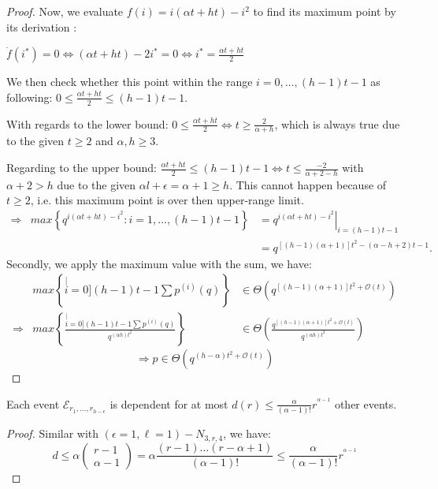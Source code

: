 \begin{proof}
Now, we evaluate $f(i)=i(\alpha t+ht)-i^{2}$ to find its maximum
point by its derivation : 

$\dot{f}(i^{*})=0\Leftrightarrow(\alpha t+ht)-2i^{*}=0\Leftrightarrow i^{*}=\frac{\alpha t+ht}{2}$

We then check whether this point within the range $i=0,\ldots,(h-1)t-1$
as following: $0\leq\frac{\alpha t+ht}{2}\leq(h-1)t-1$.

With regards to the lower bound: $0\leq\frac{\alpha t+ht}{2}\Leftrightarrow t\geq\frac{2}{\alpha+h}$,
which is always true due to the given $t\geq2$ and $\alpha,h\geq3$.

Regarding to the upper bound: $\frac{\alpha t+ht}{2}\leq(h-1)t-1\Leftrightarrow t\leq\frac{-2}{\alpha+2-h}$
with $\alpha+2>h$ due to the given $\alpha l+\epsilon=\alpha+1\geq h$.
This cannot happen because of $t\geq2$, i.e. this maximum point is
over then upper-range limit.
\begin{eqnarray*}
\Rightarrow & max\left\{ q^{i(\alpha t+ht)-i^{2}}:i=1,\ldots,(h-1)t-1\right\}  & =\left.q^{i(\alpha t+ht)-i^{2}}\right|_{i=(h-1)t-1}\\
 &  & =q^{\left[\left(h-1\right)\left(\alpha+1\right)\right]t^{2}-\left(\alpha-h+2\right)t-1}.
\end{eqnarray*}
Secondly, we apply the maximum value with the sum, we have:
\begin{eqnarray*}
 & max\left\{ \stackrel[i=0]{(h-1)t-1}{\mathop{\sum}}p^{(i)}(q)\right\}  & \in\Theta\left(q^{\left[\left(h-1\right)\left(\alpha+1\right)\right]t^{2}+\mathcal{O}(t)}\right)\\
\Rightarrow & max\left\{ \frac{\stackrel[i=0]{(h-1)t-1}{\mathop{\sum}}p^{(i)}(q)}{q^{\left(\alpha h\right)t^{2}}}\right\}  & \in\Theta\left(\frac{q^{\left[\left(h-1\right)\left(\alpha+1\right)\right]t^{2}+\mathcal{O}(t)}}{q^{\left(\alpha h\right)t^{2}}}\right)
\end{eqnarray*}
\[
\Rightarrow p\in\Theta\left(q^{\left(h-\alpha\right)t^{2}+\mathcal{O}(t)}\right)
\]
\end{proof}
\begin{lem}
Each event $\mathcal{E}_{r_{1},\ldots,r_{h-\epsilon}}$ is dependent
for at most $d\left(r\right)\leq\frac{\alpha}{\left(\alpha-1\right)!}r^{^{\alpha-1}}$
other events. \label{lem:d_e1l1}
\end{lem}
\begin{proof}
Similar with $\left(\epsilon=1,\ell=1\right)-\ensuremath{N}_{3,r,4}$,
we have:
\[
d\leq\alpha\left(\begin{array}{c}
r-1\\
\alpha-1
\end{array}\right)=\alpha\frac{\left(r-1\right)\ldots\left(r-\alpha+1\right)}{\left(\alpha-1\right)!}\leq\frac{\alpha}{\left(\alpha-1\right)!}r^{^{\alpha-1}}
\]
\end{proof}
